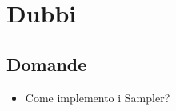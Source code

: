 \chapter{Dubbi}

\section{Domande}
\begin{itemize}
    \item Come implemento i Sampler?
\end{itemize}